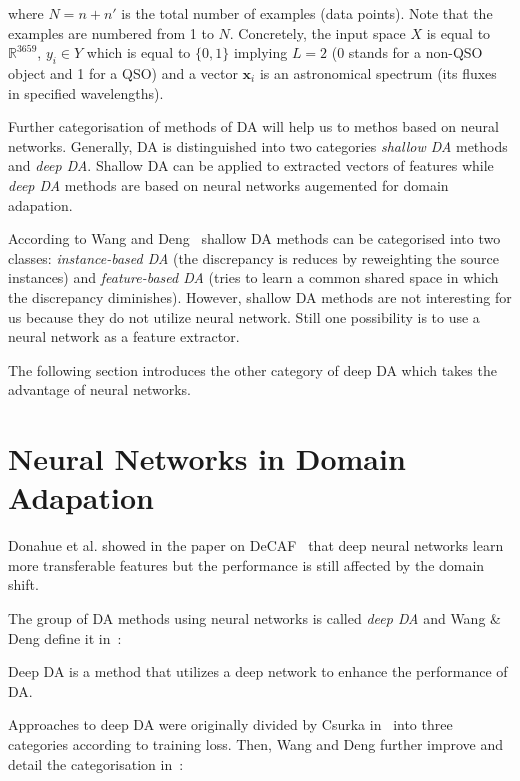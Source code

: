 where \(N = n + n'\) is the total number of examples (data points).
Note that the examples are numbered from 1 to \(N\).
Concretely, the input space \(X\) is equal to \(\mathbb{R}^{3659}\),
\(y_i \in Y\) which is equal to \(\{0, 1\}\) implying \(L = 2\)
(0 stands for a non-QSO object and 1 for a QSO)
and a vector \(\mathbf{x}_i\) is an astronomical spectrum
(its fluxes in specified wavelengths).

Further categorisation of methods of DA
will help us to methos based on neural networks.
Generally, DA is distinguished into two categories
\textit{shallow DA} methods and \textit{deep DA}.
Shallow DA can be applied to extracted vectors of features
while \textit{deep DA} methods are based on neural networks
augemented for domain adapation.~\cite{csurka2017}

According to Wang and Deng~\cite{wang2018} shallow DA methods
can be categorised into two classes:
\textit{instance-based DA}
(the discrepancy is reduces by reweighting the source instances)
and \textit{feature-based DA}
(tries to learn a common shared space in which the discrepancy diminishes).
However, shallow DA methods are not interesting for us
because they do not utilize neural network.
Still one possibility is to use a neural network as a feature extractor.~\cite{csurka2017}

The following section introduces the other category of deep DA
which takes the advantage of neural networks.

\section{Neural Networks in Domain Adapation}

Donahue et al. showed in the paper on DeCAF~\cite{donahue2014}
that deep neural networks learn more transferable features
but the performance is still affected by the domain shift.


The group of DA methods using neural networks is called \textit{deep DA}
and Wang \& Deng define it in~\cite{wang2018}:

Deep DA is a method that utilizes a deep network to enhance the performance of DA.

Approaches to deep DA were originally divided by Csurka in~\cite{csurka2017}
into three categories according to training loss.
Then, Wang and Deng further improve and detail the categorisation in~\cite{wang2018}:

